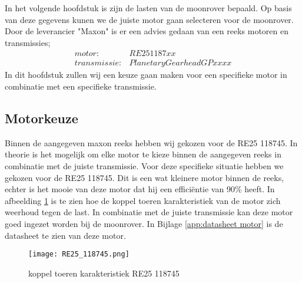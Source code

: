 In het volgende hoofdstuk is zijn de lasten van de moonrover bepaald. Op basis van deze gegevens kunen we de juiste motor gaan selecteren voor de moonrover. Door de leverancier "Maxon" is er een advies gedaan van een reeks motoren en transmissies;
\begin{align*}
        motor: &RE25 1187xx\\
        transmissie: &Planetary Gearhead GP xx xx
\end{align*}
In dit hoofdstuk zullen wij een keuze gaan maken voor een specifieke motor in combinatie met een specifieke transmissie.


\subsection{Motorkeuze}
Binnen de aangegeven maxon reeks hebben wij gekozen voor de RE25 118745. In theorie is het mogelijk om elke motor te kieze binnen de aangegeven reeks in combinatie met de juiste transmissie. Voor deze specifieke situatie hebben we gekozen voor de RE25 118745. Dit is een wat kleinere motor binnen de reeks, echter is het mooie van deze motor dat hij een efficiëntie van 90\% heeft. In afbeelding \ref{fig:RE25_118745} is te zien hoe de koppel toeren karakteristiek van de motor zich weerhoud tegen de last. In combinatie met de juiste transmissie kan deze motor goed ingezet worden bij de moonrover. In Bijlage \ref{app:datasheet motor} is de datasheet te zien van deze motor.
        \begin{figure}[H]
                \centering
                \texttt{[image: RE25\_118745.png]}
                \caption{koppel toeren karakteristiek RE25 118745}
                \label{fig:RE25_118745}
        \end{figure}

\newpage


